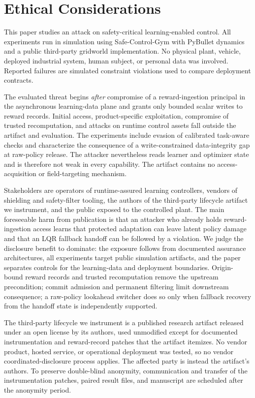 \section*{Ethical Considerations}

This paper studies an attack on safety-critical learning-enabled control.  All
experiments run in simulation using Safe-Control-Gym with PyBullet dynamics
and a public third-party gridworld implementation.  No physical plant,
vehicle, deployed industrial system, human subject, or personal data was
involved.  Reported failures are simulated constraint violations used to
compare deployment contracts.

The evaluated threat begins \emph{after} compromise of a reward-ingestion
principal in the asynchronous learning-data plane and grants only bounded
scalar writes to reward records.  Initial access, product-specific
exploitation, compromise of trusted recomputation, and attacks on runtime
control assets fall outside the artifact and evaluation.  The experiments
include evasion of calibrated task-aware checks and characterize the
consequence of a write-constrained data-integrity gap at raw-policy release.
The attacker nevertheless reads learner and optimizer state and is therefore
not weak in every capability.  The artifact contains no access-acquisition or
field-targeting mechanism.

Stakeholders are operators of runtime-assured learning controllers, vendors of
shielding and safety-filter tooling, the authors of the third-party lifecycle
artifact we instrument, and the public exposed to the controlled plant.  The main foreseeable harm from publication is that an attacker who
already holds reward-ingestion access learns that protected adaptation can
leave latent policy damage and that an LQR fallback handoff can be followed by a
violation.  We judge the disclosure benefit to dominate: the exposure follows
from documented assurance architectures, all experiments target public
simulation artifacts, and the paper separates controls for the learning-data
and deployment boundaries.  Origin-bound reward records and trusted recomputation
remove the upstream precondition; commit admission and permanent filtering
limit downstream consequence; a raw-policy lookahead switcher does so only
when fallback recovery from the handoff state is independently supported.

The third-party lifecycle we instrument is a published research artifact
released under an open license by its authors, used unmodified except for
documented instrumentation and reward-record patches that the artifact
itemizes.  No vendor product, hosted service, or operational deployment was
tested, so no vendor coordinated-disclosure process applies.  The affected
party is instead the artifact's authors.  To preserve double-blind anonymity,
communication and transfer of the instrumentation patches, paired result files,
and manuscript are scheduled after the anonymity period.

